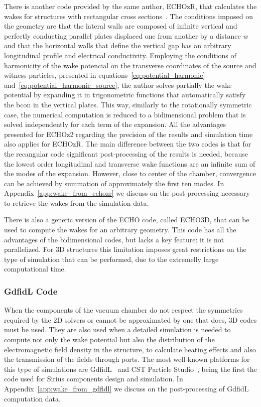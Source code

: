     There is another code provided by the same author, ECHOzR, that calculates the wakes for structures with rectangular cross sections~\cite{Zagorodnov2015}. The conditions imposed on the geometry are that the lateral walls are composed of infinite vertical and perfectly conducting parallel plates displaced one from another by a distance $w$ and that the horizontal walls that define the vertical gap has an arbitrary longitudinal profile and electrical conductivity. Employing the conditions of harmonicity of the wake potencial on the transverse coordinates of the source and witness particles, presented in equations~\eqref{eq:potential_harmonic} and~\eqref{eq:potential_harmonic_source}, the author solves partially the wake potential by expanding it in trigonometric functions that automatically satisfy the \gls{bcon} in the vertical plates. This way, similarly to the rotationally symmetric case, the numerical computation is reduced to a bidimensional problem that is solved independently for each term of the expansion. All the advantages presented for ECHOz2 regarding the precision of the results and simulation time also applies for ECHOzR. The main difference between the two codes is that for the recangular code significant post-processing of the results is needed, because the lowest order longitudinal and transverse wake functions are an infinite sum of the modes of the expansion. However, close to center of the chamber, convergence can be achieved by summation of approximately the first ten modes. In Appendix~\ref{app:wake_from_echozr} we discuss on the post processing necessary to retrieve the wakes from the simulation data.

    There is also a generic version of the ECHO code, called ECHO3D, that can be used to compute the wakes for an arbitrary geometry. This code has all the advantages of the bidimensional codes, but lacks a key feature: it is not parallelized. For 3D structures this limitation imposes great restrictions on the type of simulation that can be performed, due to the extremelly large computational time.

\subsubsection{GdfidL Code}

    When the components of the vacuum chamber do not respect the symmetries required by the 2D solvers or cannot be approximated by one that does, 3D codes must be used. They are also used when a detailed simulation is needed to compute not only the wake potential but also the distribution of the electromagnetic field density in the structure, to calculate heating effects and also the transmission of the fields through ports. The most well-known platforms for this type of simulations are GdfidL~\cite{Bruns1997, Bruns2017} and CST Particle Studio~\cite{CST2017}, being the first the code used for Sirius components design and simulation. In Appendix~\ref{app:wake_from_gdfidl} we discuss on the post-processing of GdfidL computation data.


